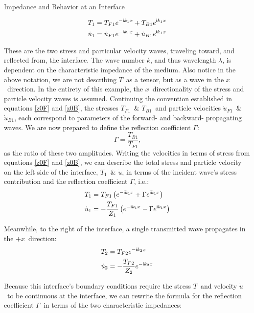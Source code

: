\documentclass[a4paper,10pt]{report}
\numberwithin{equation}{section}
\begin{document}
{\begin{chapter}
\begin{section}{Impedance and Behavior at an Interface}
\begin{singlespace}
\begin{align}
T_{1} &= T_{F1}e^{-\mathsf{i}k_1x} + T_{B1}e^{\mathsf{i}k_1x}\notag\\
\dot{u}_{1} &= \dot{u}_{F1}e^{-\mathsf{i}k_1x} + \dot{u}_{B1}e^{\mathsf{i}k_1x}
\end{align}
\end{singlespace}
These are the two stress and particular velocity waves, traveling toward, and reflected from, the interface.
The wave number $k$, and thus wavelength $\lambda$, is dependent on the characteristic impedance of the medium. Also notice in the above notation, we are not describing $T$\  as a tensor, but as a wave in the $x$\  direction. In the entirety of this example, the $x$\  directionality of the stress and particle velocity waves is assumed. Continuing the convention established in equations \eqref{z0F} and \eqref{z0B}, the stresses $T_{F1}$\  \& $T_{B1}$\  and particle velocities $\dot{u}_{F1}$\  \& $\dot{u}_{B1}$, each correspond to parameters of the forward- and backward- propagating waves. We are now prepared to define the reflection coefficient $\Gamma$:
\begin{equation}
 \Gamma = \frac{T_{B1}}{T_{F1}} \text{,}
\end{equation}
as the ratio of these two amplitudes.
Writing the velocities in terms of stress from equations \eqref{z0F} and \eqref{z0B}, we can describe the total stress and particle velocity on the left side of the interface, $T_1$\  \& $\dot{u}$, in terms of the incident wave's stress contribution and the reflection coefficient $\Gamma$, i.e.:
\begin{align}
 T_{1} &= T_{F1}\left(e^{-\mathsf{i}k_1x} + \Gamma e^{\mathsf{i}k_1x}\right)\notag \\
 \dot{u}_{1} &= -\frac{T_{F1}}{Z_1}\left(e^{-\mathsf{i}k_1x} - \Gamma e^{\mathsf{i}k_1x}\right)
\end{align}
\par
Meanwhile, to the right of the interface, a single transmitted wave propagates in the $+x$\  direction:
\begin{align}
 T_{2} &= T_{F2}e^{-\mathsf{i}k_2x}\notag \\
 \dot{u}_{2} &= -\frac{T_{F2}}{Z_2}e^{-\mathsf{i}k_2x}
\end{align}
\par
Because this interface's boundary conditions require the stress $T$\  and velocity $\dot{u}$\  to be continuous at the interface, we can rewrite the formula for the reflection coefficient $\Gamma$\  in terms of the two characteristic impedances:

\end{section}
\end{chapter}}
\end{document}
